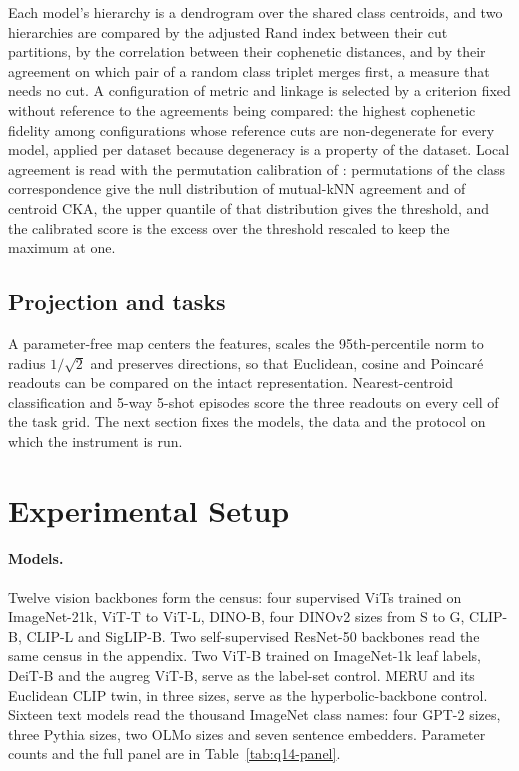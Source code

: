 \documentclass{article}
\theoremstyle{definition}
\theoremstyle{plain}
\theoremstyle{remark}
\begin{document}
Each model's hierarchy is a dendrogram over the shared class centroids, and two hierarchies are compared by the adjusted Rand index between their cut partitions, by the correlation between their cophenetic distances, and by their agreement on which pair of a random class triplet merges first, a measure that needs no cut. A configuration of metric and linkage is selected by a criterion fixed without reference to the agreements being compared: the highest cophenetic fidelity among configurations whose reference cuts are non-degenerate for every model, applied per dataset because degeneracy is a property of the dataset. Local agreement is read with the permutation calibration of \citet{groger2026aristotelian}: permutations of the class correspondence give the null distribution of mutual-kNN agreement and of centroid CKA, the upper quantile of that distribution gives the threshold, and the calibrated score is the excess over the threshold rescaled to keep the maximum at one.

\subsection{Projection and tasks}
\label{sec:v3-projection}

A parameter-free map centers the features, scales the 95th-percentile norm to radius $1/\sqrt2$ and preserves directions, so that Euclidean, cosine and Poincar\'{e} readouts can be compared on the intact representation. Nearest-centroid classification and 5-way 5-shot episodes score the three readouts on every cell of the task grid. The next section fixes the models, the data and the protocol on which the instrument is run. %

\section{Experimental Setup}
\label{sec:v3-setup}

\paragraph{Models.} Twelve vision backbones form the census: four supervised ViTs trained on ImageNet-21k, ViT-T to ViT-L, DINO-B, four DINOv2 sizes from S to G, CLIP-B, CLIP-L and SigLIP-B. Two self-supervised ResNet-50 backbones read the same census in the appendix. Two ViT-B trained on ImageNet-1k leaf labels, DeiT-B and the augreg ViT-B, serve as the label-set control. MERU and its Euclidean CLIP twin, in three sizes, serve as the hyperbolic-backbone control. Sixteen text models read the thousand ImageNet class names: four GPT-2 sizes, three Pythia sizes, two OLMo sizes and seven sentence embedders. Parameter counts and the full panel are in Table~\ref{tab:q14-panel}.
\end{document}
